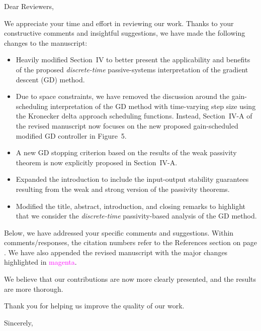 Dear Reviewers,

We appreciate your time and effort in reviewing our work. Thanks to your constructive comments and insightful suggestions, we have made the following changes to the manuscript:
\begin{itemize}
    \item{%
        Heavily modified Section~IV to better present the applicability and benefits of the proposed \emph{discrete-time} passive-systems interpretation of the gradient descent (GD) method. 
    }%
    \item{%
        Due to space constraints, we have removed the discussion around the gain-scheduling interpretation of the GD method with time-varying step size using the Kronecker delta approach scheduling functions. Instead, Section~IV-A of the revised manuscript now focuses on the new proposed gain-scheduled modified GD controller in Figure~5.
    }%
    \item{%
        A new GD stopping criterion based on the results of the weak passivity theorem is now explicitly proposed in Section~IV-A.
    }%
    \item{%
        Expanded the introduction to include the input-output stability guarantees resulting from the weak and strong version of the passivity theorems. 
    }%
    \item{%
        Modified the title, abstract, introduction, and closing remarks to highlight that we consider the \emph{discrete-time} passivity-based analysis of the GD method.
    }%
    
\end{itemize}
Below, we have addressed your specific comments and suggestions. Within comments/responses, the citation numbers refer to the References section on page \pageref{endofcontent}. We have also appended the revised manuscript with the major changes highlighted in \textcolor{magenta}{magenta}.

We believe that our contributions are now more clearly presented, and the results are more thorough. 

Thank you for helping us improve the quality of our work.



Sincerely,\\[1em]%
\theauthor